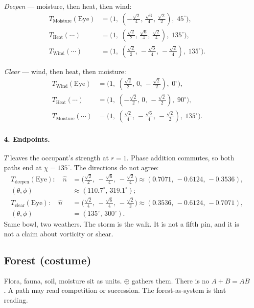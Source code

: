 \documentclass[12pt, a4paper]{article}
\begin{document}
\emph{Deepen} --- moisture, then heat, then wind:
\begin{align*}
T_{\mathrm{Moisture}}(\mathrm{Eye})
&= \bigl(1,\;(-\tfrac{\sqrt{2}}{4},\,\tfrac{\sqrt{6}}{4},\,\tfrac{\sqrt{2}}{2}),\;45^\circ\bigr),\\
T_{\mathrm{Heat}}(\cdots)
&= \bigl(1,\;(\tfrac{\sqrt{2}}{2},\,\tfrac{\sqrt{6}}{4},\,\tfrac{\sqrt{2}}{4}),\;135^\circ\bigr),\\
T_{\mathrm{Wind}}(\cdots)
&= \bigl(1,\;(\tfrac{\sqrt{2}}{2},\,-\tfrac{\sqrt{6}}{4},\,-\tfrac{\sqrt{2}}{4}),\;135^\circ\bigr).
\end{align*}

\emph{Clear} --- wind, then heat, then moisture:
\begin{align*}
T_{\mathrm{Wind}}(\mathrm{Eye})
&= \bigl(1,\;(\tfrac{\sqrt{2}}{2},\,0,\,-\tfrac{\sqrt{2}}{2}),\;0^\circ\bigr),\\
T_{\mathrm{Heat}}(\cdots)
&= \bigl(1,\;(-\tfrac{\sqrt{2}}{2},\,0,\,-\tfrac{\sqrt{2}}{2}),\;90^\circ\bigr),\\
T_{\mathrm{Moisture}}(\cdots)
&= \bigl(1,\;(\tfrac{\sqrt{2}}{4},\,-\tfrac{\sqrt{6}}{4},\,-\tfrac{\sqrt{2}}{2}),\;135^\circ\bigr).
\end{align*}

\paragraph{4. Endpoints.}
$T$ leaves the occupant's strength at $r=1$. Phase addition commutes, so
both paths end at $\chi=135^\circ$. The directions do not agree:
\begin{align*}
T_{\mathrm{deepen}}(\mathrm{Eye}):
\quad
\hat n
&= \bigl(\tfrac{\sqrt{2}}{2},\,-\tfrac{\sqrt{6}}{4},\,-\tfrac{\sqrt{2}}{4}\bigr)
\approx (0.7071,\,-0.6124,\,-0.3536),\\
(\theta,\phi)&\approx(110.7^\circ,\,319.1^\circ);\\[0.4em]
T_{\mathrm{clear}}(\mathrm{Eye}):
\quad
\hat n
&= \bigl(\tfrac{\sqrt{2}}{4},\,-\tfrac{\sqrt{6}}{4},\,-\tfrac{\sqrt{2}}{2}\bigr)
\approx (0.3536,\,-0.6124,\,-0.7071),\\
(\theta,\phi)&=(135^\circ,\,300^\circ).
\end{align*}
Same bowl, two weathers. The storm is the walk. It is not a fifth pin,
and it is not a claim about vorticity or shear.

\subsection{Forest (costume)}
Flora, fauna, soil, moisture sit as units. $\oplus$ gathers them.
There is no $A+B=AB$. A path may read competition or succession.
The forest-as-system is that reading.
\end{document}
